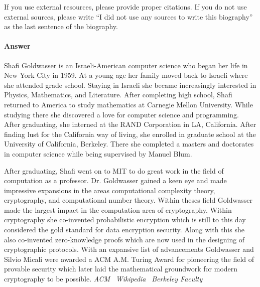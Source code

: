 \documentclass{article}
\begin{document}
If you use external resources, please provide
proper citations. If you do not use external sources, please write ``I did not
use any sources to write this biography'' as the last sentence of the
biography.

\paragraph{Answer}

Shafi Goldwasser is an Israeli-American computer science who began her life in New York City in 1959.
At a young age her family moved back to Israeli where she attended grade school. Staying
in Israeli she became increasingly interested in Physics, Mathematics, and Literature.
After completing high school, Shafi returned to America to study mathematics at Carnegie Mellon University.
While studying there she discovered a love for computer science and programming. After graduating, she interned at
the RAND Corporation in LA, California. After finding lust for the California way of living, she enrolled
in graduate school at the University of California, Berkeley. There she completed a masters and doctorates in
computer science while being supervised by Manuel Blum.

After graduating, Shafi went on to MIT to do great work
in the field of computation as a professor. Dr. Goldwasser gained a keen eye and made impressive
 expansions in the areas computational complexity theory, cryptography, and computational number theory.
Within theses field Goldwasser made the largest impact in the computation area of cryptography.
Within cryptography she co-invented probabilistic encryption which is still to this day considered
the gold standard for data encryption security. Along with this she also co-invented
zero-knowledge proofs which are now used in the designing of cryptographic protocols. With an expansive
list of advancements Goldwasser and Silvio Micali were awarded a ACM A.M. Turing Award for pioneering the field
of provable security which later laid the mathematical groundwork for modern cryptography to be possible.
\emph{ACM}~\cite{acm}
\emph{Wikipedia}~\cite{wikipedia}
\emph{Berkeley Faculty}~\cite{berkeley}


 \newpage
 
 
\end{document}
